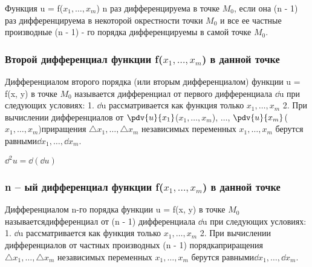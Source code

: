 \documentclass[a4paper, 12pt]{article}
\def\newline{}%
\begin{document}
            Функция u = f($x_1, \ldots, x_m$) n раз дифференцируема в точке $M_0$,
            если она (n - 1) раз дифференцируема в некоторой окрестности точки $M_0$
            и все ее частные производные (n - 1) - го порядка дифференцируемы в самой
            точке $M_0$.

            \subsubsection{Второй дифференциал функции f(\texorpdfstring{$x_1, \ldots, x_m$}{Lg}) в данной точке}

            Дифференциалом второго порядка (или вторым дифференциалом) функции
            u = f(x, y) в точке $M_0$ называется дифференциал от первого дифференциала
            $\dd$u при следующих условиях:\newline
            1. $\dd$u рассматривается как функция только $x_1, \ldots, x_m$\newline
            2. При вычислении дифференциалов от $\pdv{u}{x_1}$($x_1, \ldots, x_m$),
            $\ldots$, $\pdv{u}{x_m}$($x_1, \ldots, x_m$)\newline приращения
            $\triangle x_1, \ldots, \triangle x_m$ независимых переменных
            $x_1, \ldots, x_m$ берутся равными\newline $\dd x_1, \ldots, \dd x_m$.

            ${\dd}^2 u = \dd(\dd u)$

            \subsubsection{n – ый дифференциал функции f(\texorpdfstring{$x_1, \ldots, x_m$}{Lg}) в данной точке}

            Дифференциалом n-го порядка функции
            u = f(x, y) в точке $M_0$ называется\newline дифференциал от (n - 1) дифференциала
            $\dd$u при следующих условиях:\newline
            1. $\dd$u рассматривается как функция только $x_1, \ldots, x_m$\newline
            2. При вычислении дифференциалов от частных производных 
            (n - 1) порядка\newline приращения
            $\triangle x_1, \ldots, \triangle x_m$ независимых переменных
            $x_1, \ldots, x_m$ берутся равными\newline $\dd x_1, \ldots, \dd x_m$.
\end{document}

